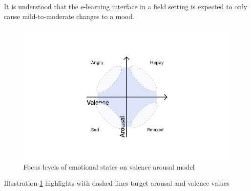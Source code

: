 It is understood that the e-learning interface in a field setting is expected to only cause mild-to-moderate changes to a mood. 


\begin{figure}
	\centering
	\includegraphics[width=0.7\linewidth]{graphics/Valence-Arousal-Model-1.png}
	\caption{Focus levels of emotional states on valence arousal model}
	\label{fig:valence-arousal-model-2}
\end{figure}

Illustration \ref{fig:valence-arousal-model-2} highlights with dashed lines target arousal and valence values
